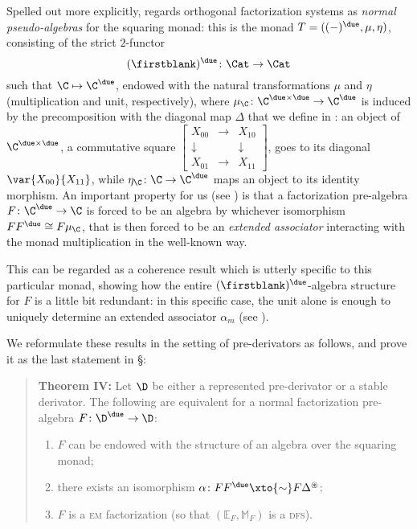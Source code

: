 Spelled out more explicitly, \cite[\athm\textbf{B}]{Korostenski199357} regards orthogonal factorization systems as \emph{normal pseudo-algebras} for the squaring monad: this is the monad $T=((-)^\due,\mu,\eta)$, consisting of the strict $2$-functor
\[
(\firstblank)^\due\colon \Cat\to \Cat
\]
such that $\C\mapsto \C^\due$, endowed with the natural transformations $\mu$ and $\eta$ (multiplication and unit, respectively), where $\mu_\C\colon \C^{\due\times \due}\to \C^\due$ is induced by the precomposition with the diagonal map $\Delta$ that we define in : an object of $\C^{\due\times\due}$, \ie a commutative square $\left[\begin{smallmatrix} X_{00} &\to& X_{10} \\ \downarrow && \downarrow \\ X_{01} &\to& X_{11}\end{smallmatrix}\right]$, goes to its diagonal $\var{X_{00}}{X_{11}}$, while $\eta_\C\colon \C\to \C^\due$ maps an object to its identity morphism. An important property for us (see \cite{Korostenski199357,RW}) is that a factorization pre-algebra $F\colon \C^\due\to \C$ is forced to be an algebra by whichever isomorphism $FF^\due\cong F\mu_\C$, that is then forced to be an \emph{extended associator} interacting with the monad multiplication in the well-known way.

This can be regarded as a coherence result which is utterly specific to this particular monad, showing how the entire $(\firstblank)^\due$-algebra structure for $F$ is a little bit redundant: in this specific case, the unit alone is enough to uniquely determine an extended associator $\alpha_m$ (see \adef{}).

We reformulate these results in the setting of pre-derivators as follows, and prove it as the last statement in §:
\begin{quote}
\textbf{Theorem \textbf{IV}:} Let $\D$ be either a represented pre-derivator or a stable derivator. The following are equivalent for a normal factorization pre-algebra $F\colon \D^\due\to \D$:
\begin{enumerate}
\item $F$ can be endowed  with the structure of an algebra over the squaring monad;
\item there exists an isomorphism $\alpha\colon FF^\due \xto{\sim} F\Delta^\circledast$;
\item $F$ is a \textsc{em} factorization (so that $(\mathbb E_F,\mathbb M_F)$ is a \textsc{dfs}).
\end{enumerate}
\end{quote}
%
\medskip
